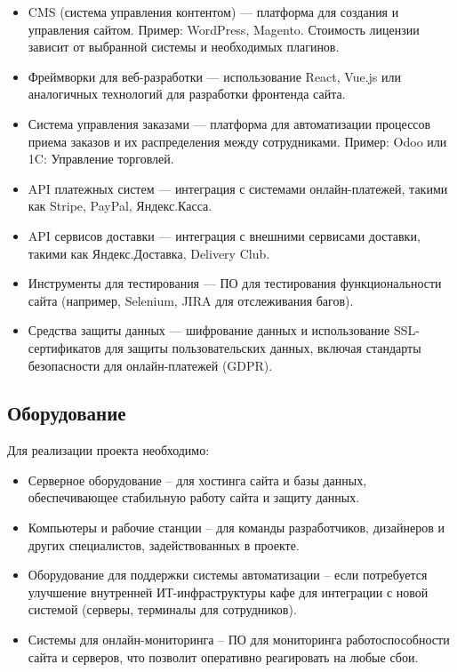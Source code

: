 \begin{itemize}
	\item CMS (система управления контентом) --- платформа для создания и управления сайтом. Пример: WordPress, Magento. Стоимость лицензии зависит от выбранной системы и необходимых плагинов.
	\item Фреймворки для веб-разработки --- использование React, Vue.js или аналогичных технологий для разработки фронтенда сайта.
	\item Система управления заказами --- платформа для автоматизации процессов приема заказов и их распределения между сотрудниками. Пример: Odoo или 1C: Управление торговлей.
	\item API платежных систем --- интеграция с системами онлайн-платежей, такими как Stripe, PayPal, Яндекс.Касса.
	\item API сервисов доставки --- интеграция с внешними сервисами доставки, такими как Яндекс.Доставка, Delivery Club.
	\item Инструменты для тестирования --- ПО для тестирования функциональности сайта (например, Selenium, JIRA для отслеживания багов).
	\item Средства защиты данных --- шифрование данных и использование SSL-сертификатов для защиты пользовательских данных, включая стандарты безопасности для онлайн-платежей (GDPR).
\end{itemize}

\subsection{Оборудование}

Для реализации проекта необходимо:

\begin{itemize}
	\item Серверное оборудование – для хостинга сайта и базы данных, обеспечивающее стабильную работу сайта и защиту данных.
	\item Компьютеры и рабочие станции – для команды разработчиков, дизайнеров и других специалистов, задействованных в проекте.
	\item Оборудование для поддержки системы автоматизации – если потребуется улучшение внутренней ИТ-инфраструктуры кафе для интеграции с новой системой (серверы, терминалы для сотрудников).
	\item Системы для онлайн-мониторинга – ПО для мониторинга работоспособности сайта и серверов, что позволит оперативно реагировать на любые сбои.
\end{itemize}

